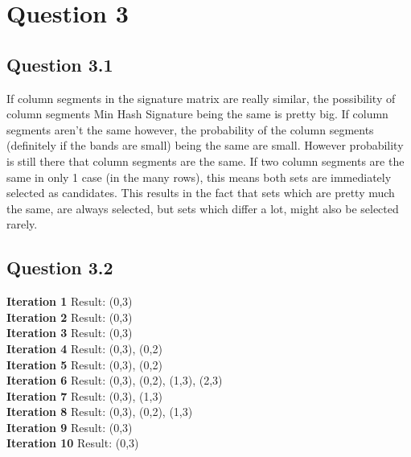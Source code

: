 \documentclass[11pt,twoside,a4paper]{article}
\begin{document}
 \section{Question 3}
 
 	\subsection{Question 3.1}
 	If column segments in the signature matrix are really similar, the possibility of column segments Min Hash Signature being the same is pretty big. If column segments aren't the same however, the probability of the column segments (definitely if the bands are small) being the same are small. However probability is still there that column segments are the same. If two column segments are the same in only 1 case (in the many rows), this means both sets are immediately selected as candidates. This results in the fact that sets which are pretty much the same, are always selected, but sets which differ a lot, might also be selected rarely.
 	
 	\subsection{Question 3.2}
 	
 	\textbf{Iteration 1}
 	Result: (0,3) \\

	\textbf{Iteration 2}
	Result: (0,3) \\

	\textbf{Iteration 3}
	Result: (0,3) \\

	\textbf{Iteration 4}
	Result: (0,3), (0,2) \\

	\textbf{Iteration 5}
	Result: (0,3), (0,2) \\

	\textbf{Iteration 6}
	Result: (0,3), (0,2), (1,3), (2,3) \\

	\textbf{Iteration 7}
	Result: (0,3), (1,3) \\

	\textbf{Iteration 8}
	Result: (0,3), (0,2), (1,3) \\

	\textbf{Iteration 9}
	Result: (0,3) \\

	\textbf{Iteration 10}
	Result: (0,3) \\
 	
\end{document}
